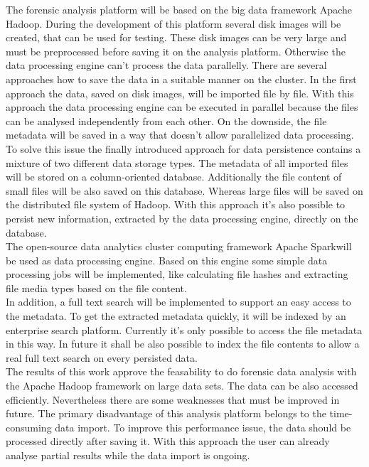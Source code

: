 \noindent
The forensic analysis platform will be based on the big data framework Apache Hadoop\textsuperscript{\textregistered}. During the development of this platform several disk images will be created, that can be used for testing. These disk images can be very large and must be preprocessed before saving it on the analysis platform. Otherwise the data processing engine can't process the data parallelly. There are several approaches how to save the data in a suitable manner on the cluster. 
In the first approach the data, saved on disk images, will be imported file by file. With this approach the data processing engine can be executed in parallel because the files can be analysed independently from each other. On the downside, the file metadata will be saved in a way that doesn't allow parallelized data processing. To solve this issue the finally introduced approach for data persistence contains a mixture of two different data storage types. The metadata of all imported files will be stored on a column-oriented database. Additionally the file content of small files will be also saved on this database. Whereas large files will be saved on the distributed file system of Hadoop. With this approach it's also possible to persist new information, extracted by the data processing engine, directly on the database.\\

\noindent
The open-source data analytics cluster computing framework Apache Spark\texttrademark\thinspace will be used as data processing engine. Based on this engine some simple data processing jobs will be implemented, like calculating file hashes and extracting file media types based on the file content.\\
In addition, a full text search will be implemented to support an easy access to the metadata. To get the extracted metadata quickly, it will be indexed by an enterprise search platform. Currently it's only possible to access the file metadata in this way. In future it shall be also possible to index the file contents to allow a real full text search on every persisted data.\\

\noindent
The results of this work approve the feasability to do forensic data analysis with the Apache Hadoop framework on large data sets. The data can be also accessed efficiently. Nevertheless there are some weaknesses that must be improved in future. The primary disadvantage of this analysis platform belongs to the time-consuming data import. To improve this performance issue, the data should be processed directly after saving it. With this approach the user can already analyse partial results while the data import is ongoing.  

